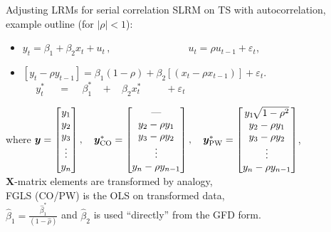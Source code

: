 \documentclass{beamer}
\begin{document}
\begin{frame}{Adjusting LRMs for serial correlation}
SLRM on TS with autocorrelation, example outline (for $|\rho|<1$):\\ \medskip
\begin{itemize}
    \item $y_t= \beta_1 + \beta_2 x_t + u_t \,,\qquad \qquad \qquad~~~~~~~\, u_t = \rho u_{t-1}+\varepsilon_t$,
    \smallskip
    \item $[y_t - \rho y_{t-1}] =  \beta_1 (1-\rho) + \beta_2 [(x_t - \rho x_{t-1})] + \varepsilon_t$.\\
    $~~~~~~y_t^{*}~~~~~~=~~~~~\beta_1^{*} ~~~~+~~~~ \beta_2 x_t^{*}~~~~~~~~~~~ + \varepsilon_t $
\end{itemize}
\bigskip
where $ \bm{y} = \begin{bmatrix}
y_1\\ y_2\\ y_3\\ \vdots\\ y_n \end{bmatrix}, \quad 
\bm{y}^{*}_{\textnormal{CO}} = \begin{bmatrix}
\textnormal{---}\\ y_2-\rho y_1\\ y_3-\rho y_2 \\ \vdots \\ y_n-\rho y_{n-1} \end{bmatrix}, \quad \bm{y}^{*}_{\textnormal{PW}} = \begin{bmatrix}
y_{1\,}\sqrt[]{1-\rho^2}\\ y_2-\rho y_1\\ y_3-\rho y_2 \\ \vdots \\ y_n-\rho y_{n-1} \end{bmatrix}$,\\ \bigskip
$\bm{X}$-matrix elements are transformed by analogy, \\ \smallskip
FGLS (CO/PW) is the OLS on transformed data, \\ \medskip 
$\hat{\beta}_1 = \frac{\hat{\beta}_1^{*}}{(1-\hat{\rho})}$ and $\hat{\beta}_2$ is used ``directly'' from the GFD form.
\end{frame}
\end{document}
